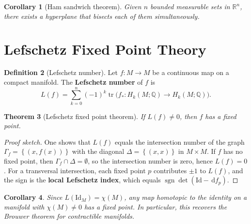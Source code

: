 \documentclass[12pt,a4paper,openany]{book}
\newtheorem{theorem}{Theorem}[section]
\newtheorem{corollary}[theorem]{Corollary}
\theoremstyle{definition}
\newtheorem{definition}[theorem]{Definition}
\theoremstyle{remark}
\newcommand{\Q}{\mathbb{Q}}
\newcommand{\R}{\mathbb{R}}
\newcommand{\Id}{\mathrm{Id}}
\newcommand{\dd}{\,\mathrm{d}}
\newcommand{\set}[1]{\left\{ #1 \right\}}
\begin{document}
\begin{corollary}[Ham sandwich theorem]\label{cor:ham-sandwich}
Given $n$ bounded measurable sets in $\R^n$, there exists a hyperplane
that bisects each of them simultaneously.
\end{corollary}

\section{Lefschetz Fixed Point Theory}\label{sec:lefschetz}

\begin{definition}[Lefschetz number]\label{def:lefschetz-number}
Let $f\colon M \to M$ be a continuous map on a compact manifold.
The \textbf{Lefschetz number} of $f$ is
\[
  L(f) = \sum_{k=0}^{n} (-1)^k \operatorname{tr}\bigl(f_*\colon H_k(M;\Q)\to H_k(M;\Q)\bigr).
\]
\end{definition}

\begin{theorem}[Lefschetz fixed point theorem]\label{thm:lefschetz}
If $L(f) \neq 0$, then $f$ has a fixed point.
\end{theorem}

\begin{proof}[Proof sketch]
One shows that $L(f)$ equals the intersection number of the graph
$\Gamma_f = \set{(x,f(x))}$ with the diagonal $\Delta = \set{(x,x)}$
in $M \times M$. If $f$ has no fixed point, then $\Gamma_f \cap \Delta = \emptyset$,
so the intersection number is zero, hence $L(f)=0$.
For a transversal intersection, each fixed point $p$ contributes
$\pm 1$ to $L(f)$, and the sign is the \textbf{local Lefschetz index},
which equals $\operatorname{sgn}\det(\Id - \dd f_p)$.
\end{proof}

\begin{corollary}\label{cor:lefschetz-brouwer}
Since $L(\Id_M) = \chi(M)$, any map homotopic to the identity on a
manifold with $\chi(M)\neq 0$ has a fixed point. In particular, this
recovers the Brouwer theorem for contractible manifolds.
\end{corollary}
\end{document}
